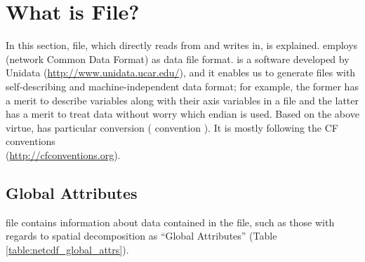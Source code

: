 \section{What is \scalenetcdf File?} \label{sec:netcdf}

In this section, \scalenetcdf file, which \scalelib directly reads from and writes in, is explained.
\scalelib employs \netcdf (network Common Data Format) as data file format.
\Netcdf is a software developed by Unidata (\url{http://www.unidata.ucar.edu/}),
and it enables us to generate files with self-describing and machine-independent data format;
for example, the former has a merit to describe variables along with their axis variables in a file and
the latter has a merit to treat data without worry which endian is used.
Based on the above virtue, \scalelib has particular conversion ( \scalenetcdf convention ).
It is mostly following the CF conventions \\ (\url{http://cfconventions.org}).


\subsection{Global Attributes}
\scalenetcdf file contains information about data contained in the file,
such as those with regards to spatial decomposition as ``Global Attributes'' (Table \ref{table:netcdf_global_attrs}).

